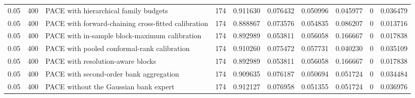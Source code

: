 \begin{tabular}{llllllllll}
0.05 & 400 & PACE with hierarchical family budgets & 174 & 0.911630 & 0.076432 & 0.050996 & 0.045977 & 0 & 0.036479 \\
0.05 & 400 & PACE with forward-chaining cross-fitted calibration & 174 & 0.888867 & 0.073576 & 0.054835 & 0.086207 & 0 & 0.013716 \\
0.05 & 400 & PACE with in-sample block-maximum calibration & 174 & 0.892989 & 0.053811 & 0.056058 & 0.166667 & 0 & 0.017838 \\
0.05 & 400 & PACE with pooled conformal-rank calibration & 174 & 0.910260 & 0.075472 & 0.057731 & 0.040230 & 0 & 0.035109 \\
0.05 & 400 & PACE with resolution-aware blocks & 174 & 0.892989 & 0.053811 & 0.056058 & 0.166667 & 0 & 0.017838 \\
0.05 & 400 & PACE with second-order bank aggregation & 174 & 0.909635 & 0.076187 & 0.050694 & 0.051724 & 0 & 0.034484 \\
0.05 & 400 & PACE without the Gaussian bank expert & 174 & 0.912127 & 0.076958 & 0.051355 & 0.051724 & 0 & 0.036976 \\
\bottomrule
\end{tabular}
